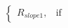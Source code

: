 \documentclass[preview]{standalone}
\begin{document}
\begin{align*}
\begin{cases}R_{slope1}, & \text{if } \end{cases}
\end{align*}
\end{document}
